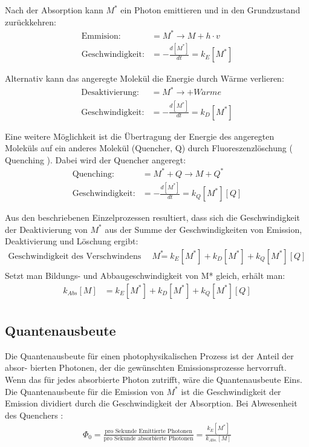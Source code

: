 \documentclass[12pt]{article}
\begin{document}
Nach der Absorption kann $M^*$ ein Photon emittieren und in den Grundzustand zurückkehren:
\begin{align*}
 \text{Emmision:} &= M^* \rightarrow M +  h \cdot v\\
 \text{Geschwindigkeit:} &= -\frac{d[M^*]}{dt} = k _{E} [M^*]
\end{align*}

Alternativ kann das angeregte Molekül die Energie durch Wärme verlieren:
\begin{align*}
 \text{Desaktivierung:} &= M^* \rightarrow +  W\ddot{a}rme\\
 \text{Geschwindigkeit:} &= - \frac{d[M^*]}{dt} = k _{D} [M^*]
\end{align*}


Eine weitere Möglichkeit ist die Übertragung der Energie des angeregten Moleküls auf ein
anderes Molekül (Quencher, Q) durch Fluoreszenzlöschung ( Quenching ). Dabei wird
der Quencher angeregt:
\begin{align*}
 \text{Quenching:} &= M^* + Q \rightarrow M +  Q^*\\
 \text{Geschwindigkeit:} &= - \frac{d[M^*]}{dt} = k _{Q} [M^*] [Q]
\end{align*}

Aus den beschriebenen Einzelprozessen resultiert, dass sich die Geschwindigkeit der Deaktivierung von $M^*$ aus der Summe der Geschwindigkeiten von Emission, Deaktivierung
und Löschung ergibt:
\begin{align*}
 \text{Geschwindigkeit des Verschwindens von } M^* &=  k _{E} [M^*] + k _{D} [M^*] + k _{Q} [M^*] [Q]\\
\end{align*}
Setzt man Bildungs- und Abbaugeschwindigkeit von M* gleich, erhält man:
\begin{align*}
 k_{Abs} [M] &=  k _{E} [M^*] + k _{D} [M^*] + k _{Q} [M^*] [Q]\\
\end{align*}
\subsection{Quantenausbeute\supercite{harris}} %
\label{ssub:quantenausbeute}

\grqq Die Quantenausbeute für einen photophysikalischen Prozess ist der Anteil der absor-
bierten Photonen, der die gewünschten Emissionsprozesse hervorruft. Wenn das für jedes
absorbierte Photon zutrifft, wäre die Quantenausbeute Eins.\grqq
Die Quantenausbeute für die Emission von $M^*$ ist die Geschwindigkeit der Emission
dividiert durch die Geschwindigkeit der Absorption. Bei Abwesenheit des Quenchers :
\begin{align*}
  \Phi _0 = \frac{\text{pro Sekunde Emittierte Photonen}}{\text{pro Sekunde absorbierte Photonen}} = \frac{k_{E} [M^*]}{k_{Abs.} [M]}
\end{align*}
\end{document}
